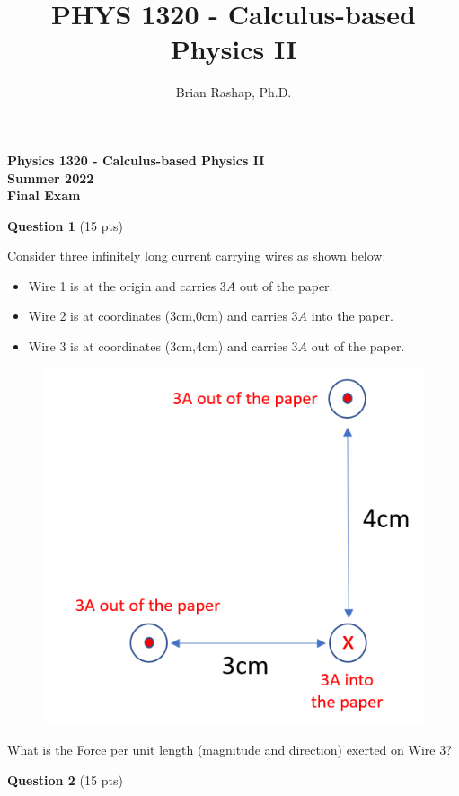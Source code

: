 \documentclass[14pt]{report}
\author{Brian Rashap, Ph.D.}
\title{PHYS 1320 - Calculus-based Physics II}
\begin{document}
\begin{center}
\textbf{Physics 1320 - Calculus-based Physics II \\ Summer 2022 \\ Final Exam}
\end{center}

\textbf{Question 1} (15 pts)



Consider three infinitely long current carrying wires as shown below:
\begin{itemize}
\item Wire 1 is at the origin and carries $3A$ out of the paper.
\item Wire 2 is at coordinates (3cm,0cm) and carries $3A$ into the paper.
\item Wire 3 is at coordinates (3cm,4cm) and carries $3A$ out of the paper.
\end{itemize}

\begin{figure}[H]
\begin{center}
\includegraphics[scale=0.38]{final_1.png}
\end{center}
\end{figure}

What is the Force per unit length (magnitude and direction) exerted on Wire 3?

\textbf{Question 2} (15 pts)
\end{document}
